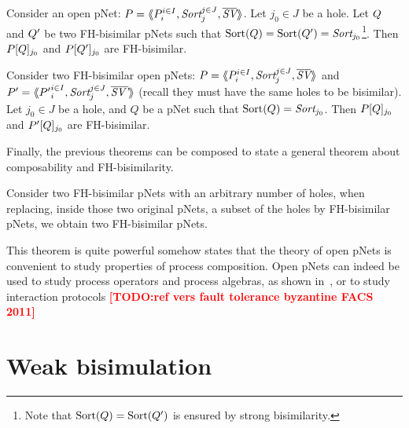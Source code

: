 \documentclass{lncs/llncs}
\newcommand{\TODO}[1]{\textcolor{red}{\textbf{[TODO:#1]}}}
\begin{document}
\begin{theorem}[Congruence]\label{thm-congr-eq}
	Consider an open pNet:
	$\pNet = \mylangle \pNet_i^{i\in I}, \Sort_j^{j\in J}, 
	\set{\symb{SV}}\myrangle$.
	Let $j_0\in J$ be a hole. Let $Q$ and $Q'$ be two FH-bisimilar pNets such that 
	$\Sortop(\pNetQ)=\Sortop(\pNetQ')=\Sort_{j_0}$\footnote{Note that $\operatorname{Sort}(Q)=\operatorname{Sort}(Q')$ is 
	ensured by 
	strong bisimilarity.}. Then 
	$P[Q]_{j_0}$ and 
	$P[Q']_{j_0}$ are FH-bisimilar.
\end{theorem}

\begin{theorem}\label{thm-ctxt-eq}
	Consider two FH-bisimilar open pNets:
	$\pNet = \mylangle \pNet_i^{i\in I}, \Sort_j^{j\in J}, 
	\set{\symb{SV}}\myrangle$ and 	$\pNet' = \mylangle {\pNet'}_i^{i\in I}, 
	\Sort_j^{j\in 
	J}, 	\set{\symb{SV'}}\myrangle$ 
	(recall they must have the same holes to be bisimilar).
	Let $j_0\in J$ be a hole, and $Q$ be a pNet such that $\Sortop(Q)=\Sort_{j_0}$. Then 
	$P[Q]_{j_0}$ and 
	$P'[Q]_{j_0}$ are FH-bisimilar.
\end{theorem}

Finally, the previous theorems can be composed to state a general theorem about 
composability and FH-bisimilarity.
\begin{theorem}[Composability] \label{thm-composability}
	Consider two FH-bisimilar pNets with an arbitrary number of holes, when replacing, 
	inside those two original pNets, a subset of the holes by FH-bisimilar pNets, we 
	obtain two FH-bisimilar pNets.
\end{theorem}
This theorem is quite powerful somehow states that the theory of open pNets is convenient to study properties of process composition. Open pNets can indeed be used to study process operators and process algebras, as shown in~\cite{henrio:Forte2016}, or to study interaction protocols \TODO{ref vers fault tolerance byzantine FACS 2011}

\section{Weak bisimulation}\label{sec:weak}
\end{document}
